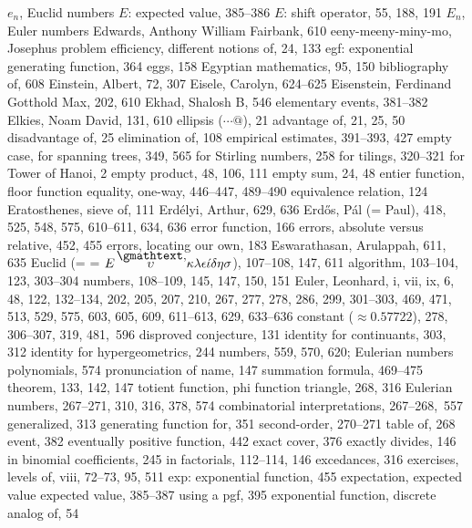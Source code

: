 $e_n$, \see Euclid numbers
$E$: expected value, 385--386
$E$: shift operator, 55, 188, 191
$E_n$, \see Euler numbers
Edwards, Anthony William Fairbank, 610
eeny-meeny-miny-mo, \see Josephus problem
efficiency, different notions of, 24, 133
egf: exponential generating function, 364
eggs, 158
Egyptian mathematics, 95, 150
\sub bibliography of, 608
Einstein, Albert, 72, 307
Eisele, Carolyn, 624--625
Eisenstein, Ferdinand Gotthold Max, 202, 610
Ekhad, Shalosh B, 546
elementary events, 381--382
Elkies, Noam David, 131, 610
ellipsis ($\cdots@$), 21
\sub advantage of, 21, 25, 50
\sub disadvantage of, 25
\sub elimination of, 108
empirical estimates, 391--393, 427
empty case,
\sub for spanning trees, 349, 565
\sub for Stirling numbers, 258
\sub for tilings, 320--321
\sub for Tower of Hanoi, 2
empty product, 48, 106, 111
empty sum, 24, 48
entier function, \see floor function
equality, one-way, 446--447, 489--490
equivalence relation, 124
Eratosthenes, sieve of, 111
Erd\'elyi, Arthur, 629, 636
Erd\H os, P\'al (= Paul), 418, 525, 548, 575, 610--611, 634, 636
error function, 166
errors, absolute versus relative, 452, 455
errors, locating our own, 183
Eswarathasan, Arulappah, 611, 635
Euclid (= {=\teni \mathchardef{} $E%
{\buildrel\,\smash{\hbox{\gmathtext,}}\over{\upsilon}}%
  \kappa\lambda\epsilon\acute\iota\delta\eta\varsigma$}), 107--108, 147, 611
\sub algorithm, 103--104, 123, 303--304
\sub numbers, 108--109, 145, 147, 150, 151
Euler, Leonhard, i, vii, ix, 6, 48, 122, 132--134, 202, 205, 207, 210, %
  267, 277, 278, 286, 299, 301--303, 469, 471, 513, 529, 575, 603, %
  605, 609, 611--613, 629, 633--636
\sub constant ($\approx0.57722$), 278, 306--307, 319, 481,~596
\sub disproved conjecture, 131
\sub identity for continuants, 303, 312
\sub identity for hypergeometrics, 244
\sub numbers, 559, 570, 620; \also Eulerian numbers
\sub polynomials, 574
\sub pronunciation of name, 147
\sub summation formula, 469--475
\sub theorem, 133, 142, 147
\sub totient function, \see phi function
\sub triangle, 268, 316
Eulerian numbers, 267--271, 310, 316, 378, 574
\sub combinatorial interpretations, 267--268,~557
\sub generalized, 313
\sub generating function for, 351
\sub second-order, 270--271
\sub table of, 268
event, 382
eventually positive function, 442
exact cover, 376
exactly divides, 146
\sub in binomial coefficients, 245
\sub in factorials, 112--114, 146
excedances, 316
exercises, levels of, viii, 72--73, 95, 511
exp: exponential function, 455
expectation, \see expected value
expected value, 385--387
\sub using a pgf, 395
exponential function, discrete analog of, 54
